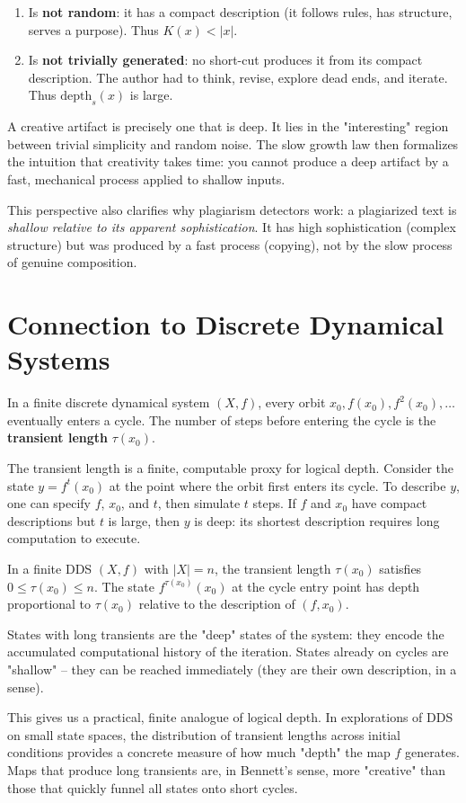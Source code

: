\begin{enumerate}
\item Is \textbf{not random}: it has a compact description (it follows rules, has structure, serves a purpose). Thus $K(x) < |x|$.
\item Is \textbf{not trivially generated}: no short-cut produces it from its compact description. The author had to think, revise, explore dead ends, and iterate. Thus $\text{depth}_s(x)$ is large.
\end{enumerate}

A creative artifact is precisely one that is deep. It lies in the "interesting" region between trivial simplicity and random noise. The slow growth law then formalizes the intuition that creativity takes time: you cannot produce a deep artifact by a fast, mechanical process applied to shallow inputs.

This perspective also clarifies why plagiarism detectors work: a plagiarized text is \textit{shallow relative to its apparent sophistication}. It has high sophistication (complex structure) but was produced by a fast process (copying), not by the slow process of genuine composition.

\section{Connection to Discrete Dynamical Systems}

In a finite discrete dynamical system $(X, f)$, every orbit $x_0, f(x_0), f^2(x_0), \ldots$ eventually enters a cycle. The number of steps before entering the cycle is the \textbf{transient length} $\tau(x_0)$.

The transient length is a finite, computable proxy for logical depth. Consider the state $y = f^t(x_0)$ at the point where the orbit first enters its cycle. To describe $y$, one can specify $f$, $x_0$, and $t$, then simulate $t$ steps. If $f$ and $x_0$ have compact descriptions but $t$ is large, then $y$ is deep: its shortest description requires long computation to execute.

\begin{proposition}
In a finite DDS $(X, f)$ with $|X| = n$, the transient length $\tau(x_0)$ satisfies $0 \leq \tau(x_0) \leq n$. The state $f^{\tau(x_0)}(x_0)$ at the cycle entry point has depth proportional to $\tau(x_0)$ relative to the description of $(f, x_0)$.

States with long transients are the "deep" states of the system: they encode the accumulated computational history of the iteration. States already on cycles are "shallow" -- they can be reached immediately (they are their own description, in a sense).

This gives us a practical, finite analogue of logical depth. In explorations of DDS on small state spaces, the distribution of transient lengths across initial conditions provides a concrete measure of how much "depth" the map $f$ generates. Maps that produce long transients are, in Bennett's sense, more "creative" than those that quickly funnel all states onto short cycles.
\end{proposition}

